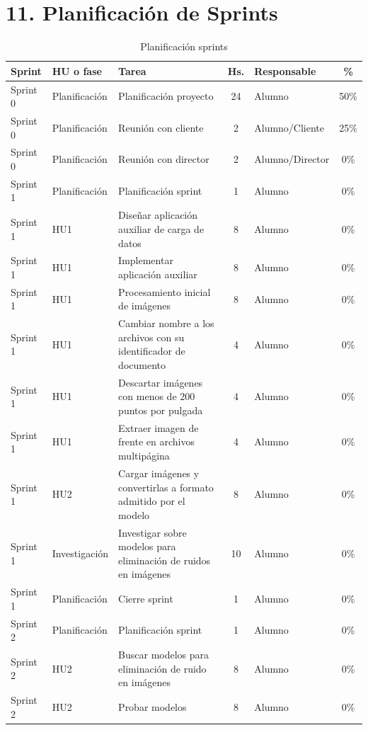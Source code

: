 \documentclass[
11pt, %
]{charter}
\begin{document}
\section{11. Planificación de Sprints}
\begin{table}[htpb]
\centering
\caption{Planificación sprints}
\begin{tabularx}{\linewidth}{@{}|l|l|X|c|l|c|@{}}
\hline
\rowcolor[HTML]{C0C0C0}
Sprint	&	HU o fase	&	Tarea	&	Hs.	&	Responsable	&	\%	\\ \hline

Sprint 0	&	Planificación	&	Planificación proyecto	&	24	&	Alumno	&	50\%	\\ \hline
Sprint 0	&	Planificación	&	Reunión con cliente	&	2	&	Alumno/Cliente	&	25\%	\\ \hline
Sprint 0	&	Planificación	&	Reunión con director	&	2	&	Alumno/Director	&	0\%	\\ \hline
Sprint 1	&	Planificación	&	Planificación sprint	&	1	&	Alumno	&	0\%	\\ \hline
Sprint 1	&	HU1	&	Diseñar aplicación auxiliar de carga de datos	&	8	&	Alumno	&	0\%	\\ \hline
Sprint 1	&	HU1	&	Implementar aplicación auxiliar	&	8	&	Alumno	&	0\%	\\ \hline
Sprint 1	&	HU1	&	Procesamiento inicial de imágenes	&	8	&	Alumno	&	0\%	\\ \hline
Sprint 1	&	HU1	&	Cambiar nombre a los archivos con su identificador de documento	&	4	&	Alumno	&	0\%	\\ \hline
Sprint 1	&	HU1	&	Descartar imágenes con menos de 200 puntos por pulgada	&	4	&	Alumno	&	0\%	\\ \hline
Sprint 1	&	HU1	&	Extraer imagen de frente en archivos multipágina	&	4	&	Alumno	&	0\%	\\ \hline
Sprint 1	&	HU2	&	Cargar imágenes y convertirlas a formato admitido por el modelo	&	8	&	Alumno	&	0\%	\\ \hline
Sprint 1	&	Investigación	&	Investigar sobre modelos para eliminación de ruidos en imágenes	&	10	&	Alumno	&	0\%	\\ \hline
Sprint 1	&	Planificación	&	Cierre sprint	&	1	&	Alumno	&	0\%	\\ \hline
Sprint 2	&	Planificación	&	Planificación sprint	&	1	&	Alumno	&	0\%	\\ \hline
Sprint 2	&	HU2	&	Buscar modelos para eliminación de ruido en imágenes	&	8	&	Alumno	&	0\%	\\ \hline
Sprint 2	&	HU2	&	Probar modelos	&	8	&	Alumno	&	0\%	\\ \hline

\end{tabularx}
\end{table}
\end{document}
